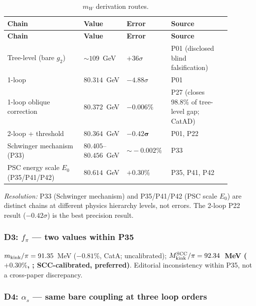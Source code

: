 \begingroup\footnotesize\renewcommand{\arraystretch}{1.2}
\begin{longtable}{@{}P{0.32\linewidth}P{0.18\linewidth}P{0.15\linewidth}P{0.25\linewidth}@{}}
\caption{$m_W$ derivation routes.}\label{tab:disc-mw}\\
\toprule
\textbf{Chain} & \textbf{Value} & \textbf{Error} & \textbf{Source} \\
\midrule \endfirsthead \midrule
\textbf{Chain} & \textbf{Value} & \textbf{Error} & \textbf{Source} \\
\midrule \endhead \bottomrule \endfoot
Tree-level (bare $g_2$) & $\sim\!109$~GeV & $+36\sigma$ & P01 (disclosed blind falsification) \\
1-loop & $80.314$~GeV & $-4.88\sigma$ & P01 \\
1-loop oblique correction & $\mathbf{80.372}$~GeV & $\mathbf{-0.006\%}$ & P27 (closes 98.8\% of tree-level gap; CatAD) \\
2-loop + threshold & $\mathbf{80.364}$~GeV & $\mathbf{-0.42\sigma}$ & P01, P22 \\
Schwinger mechanism (P33) & $80.405$--$80.456$~GeV & $\sim\!-0.002\%$ & P33 \\
PSC energy scale $E_0$ (P35/P41/P42) & $80.614$~GeV & $+0.30\%$ & P35, P41, P42 \\
\end{longtable}
\endgroup

\noindent\textit{Resolution:} P33 (Schwinger mechanism) and P35/P41/P42 (PSC scale $E_0$)
are distinct chains at different physics hierarchy levels, not errors.
The 2-loop P22 result ($-0.42\sigma$) is the best precision result.

\subsubsection*{D3: $f_\pi$ — two values within P35}

\noindent$m_{\rm kink}/\pi = 91.35$~MeV ($-0.81\%$, CatA; uncalibrated);
\textbf{$M_{\rm kink}^{\rm SCC}/\pi = 92.34$~MeV ($+0.30\%$, \CatAL; SCC-calibrated, preferred)}.
Editorial inconsistency within P35, not a cross-paper discrepancy.

\subsubsection*{D4: $\alpha_s$ — same bare coupling at three loop orders}

